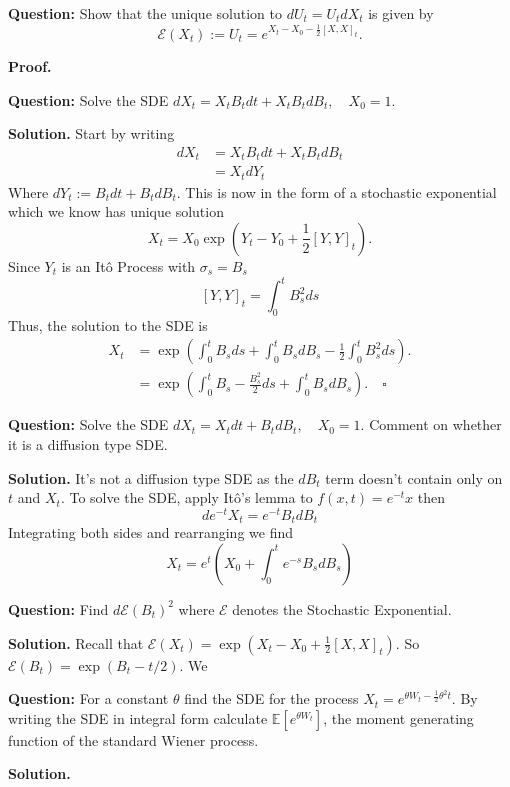 \documentclass{article}
\begin{document}
\begin{tcolorbox}[colframe=black,colback=gray!5,boxrule=0.5pt]
\textbf{Question:} Show that the unique solution to $dU_t = U_tdX_t$ is given by 
$$\mathcal{E}(X_t) := U_t = e^{X_t - X_0 - \frac{1}{2}[X,X]_t}.$$
\end{tcolorbox}
\textbf{Proof.}

\begin{tcolorbox}[colframe=black,colback=gray!5,boxrule=0.5pt]
\textbf{Question:} Solve the SDE $dX_t = X_tB_tdt + X_tB_tdB_t, \quad X_0=1$.
\end{tcolorbox}
\textbf{Solution.} Start by writing
\begin{align*}
    dX_t &= X_tB_tdt + X_tB_tdB_t \\
    &= X_tdY_t
\end{align*}
Where $dY_t := B_tdt + B_tdB_t$. This is now in the form of a stochastic exponential which we know has unique solution
$$X_t = X_0\exp\left(Y_t - Y_0 + \frac{1}{2}[Y,Y]_t\right).$$
Since $Y_t$ is an Itô Process with $\sigma_s = B_s$
$$[Y,Y]_t = \int_0^t B_s^2 ds$$
Thus, the solution to the SDE is 
\begin{align*}
    X_t &= \exp\left( \int_0^tB_sds + \int_0^t B_sdB_s - \frac{1}{2}\int_0^t B_s^2ds\right). \\
    &= \exp\left( \int_0^tB_s - \frac{B_s^2}{2}ds + \int_0^t B_sdB_s \right). \quad \square
\end{align*}

\begin{tcolorbox}[colframe=black,colback=gray!5,boxrule=0.5pt]
\textbf{Question:} Solve the SDE $dX_t = X_t dt + B_tdB_t, \quad X_0=1$. Comment on whether it is a diffusion type SDE. 
\end{tcolorbox}
\textbf{Solution.} It's not a diffusion type SDE as the $dB_t$ term doesn't contain only on $t$ and $X_t$. To solve the SDE, apply Itô's lemma to $f(x,t) = e^{-t}x$ then 
$$de^{-t}X_t = e^{-t}B_tdB_t$$
Integrating both sides and rearranging we find 
$$X_t = e^t\left(X_0 + \int_0^te^{-s}B_sdB_s\right)$$


\begin{tcolorbox}[colframe=black,colback=gray!5,boxrule=0.5pt]
\textbf{Question:} Find $d\mathcal{E}(B_t)^2$ where $\mathcal{E}$ denotes the Stochastic Exponential.
\end{tcolorbox}
\textbf{Solution.} Recall that $\mathcal{E}(X_t) = \exp(X_t - X_0 + \frac{1}{2}[X,X]_t)$. So $\mathcal{E}(B_t) = \exp(B_t - t/2).$ We 

\begin{tcolorbox}[colframe=black,colback=gray!5,boxrule=0.5pt]
\textbf{Question:} For a constant $\theta$ find the SDE for the process $X_t = e^{\theta W_t - \frac{1}{2}\theta^2 t}$. By writing the SDE in integral form calculate $\mathbb{E}[e^{\theta W_t}]$, the moment generating function of the standard Wiener process. 
\end{tcolorbox}
\textbf{Solution.}
\end{document}
